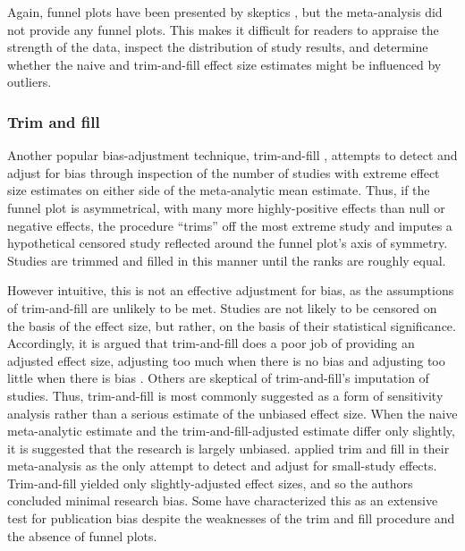 \documentclass[man]{apa6}
\begin{document}
Again, funnel plots have been presented by skeptics \citep[e.g.,][]{Ferguson:2007}, but the \citet{Anderson:etal:2010} meta-analysis did not provide any funnel plots. This makes it difficult for readers to appraise the strength of the data, inspect the distribution of study results, and determine whether the naive and trim-and-fill effect size estimates might be influenced by outliers.

\subsubsection{Trim and fill}
Another popular bias-adjustment technique, trim-and-fill \citep{Duval:Tweedie:2000}, attempts to detect and adjust for bias through inspection of the number of studies with extreme effect size estimates on either side of the meta-analytic mean estimate. Thus, if the funnel plot is asymmetrical, with many more highly-positive effects than null or negative effects, the procedure ``trims'' off the most extreme study and imputes a hypothetical censored study reflected around the funnel plot's axis of symmetry. Studies are trimmed and filled in this manner until the ranks are roughly equal. 

However intuitive, this is not an effective adjustment for bias, as the assumptions of trim-and-fill are unlikely to be met. Studies are not likely to be censored on the basis of the effect size, but rather, on the basis of their statistical significance. Accordingly, it is argued that trim-and-fill does a poor job of providing an adjusted effect size, adjusting too much when there is no bias and adjusting too little when there is bias \citep{Lakens:2014,Simonsohn:etal:2014b}. %
Others are skeptical of trim-and-fill's imputation of studies. %
Thus, trim-and-fill is most commonly suggested as a form of sensitivity analysis rather than a serious estimate of the unbiased effect size. When the naive meta-analytic estimate and the trim-and-fill-adjusted estimate differ only slightly, it is suggested that the research is largely unbiased.
\citet{Anderson:etal:2010} applied trim and fill in their meta-analysis as the only attempt to detect and adjust for small-study effects. Trim-and-fill yielded only slightly-adjusted effect sizes, and so the authors concluded minimal research bias.  %
Some have characterized this as an extensive test for publication bias \citep[][pg. 51]{Bushman:Huesmann:2014} despite the weaknesses of the trim and fill procedure and the absence of funnel plots.
\end{document}
